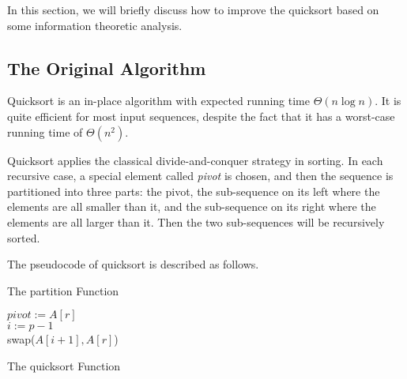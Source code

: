\documentclass[12pt]{extarticle}
\newcommand{\<}{\langle}
\renewcommand{\>}{\rangle}
\theoremstyle{definition}
\begin{document}
In this section, we will briefly discuss how to improve the quicksort based on some information theoretic analysis.

\subsection{The Original Algorithm}

Quicksort is an in-place algorithm with expected running time $\Theta(n \log n)$. It is quite efficient for most input sequences, despite the fact that it has a worst-case running time of $\Theta(n^2)$.

Quicksort applies the classical divide-and-conquer strategy in sorting. In each recursive case, a special element called \textit{pivot} is chosen, and then the sequence is partitioned into three parts: the pivot, the sub-sequence on its left where the elements are all smaller than it, and the sub-sequence on its right where the elements are all larger than it. Then the two sub-sequences will be recursively sorted.

The pseudocode of quicksort is described as follows.

\begin{algorithm}[H]
	\caption{The {\con partition} Function}
	\label{algo:quicksort_partition}
	\LinesNumbered
	$pivot := A[r]$ \\
	$i := p - 1$ \\
		{
	}
	{\con swap($A[i+1], A[r]$)} \\
\end{algorithm}

\begin{algorithm}[H]
	\caption{The {\con quicksort} Function}
	\label{algo:quicksort_original}
	\LinesNumbered
\end{algorithm}
\end{document}

